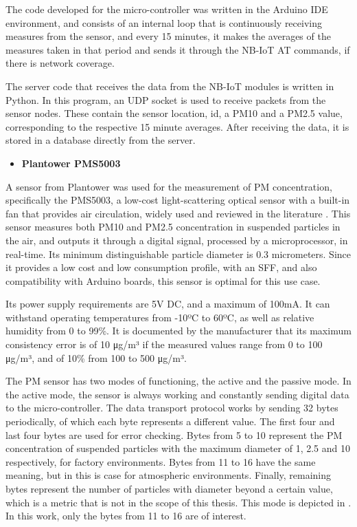 The code developed for the micro-controller was written in the Arduino IDE environment, and consists of an internal loop that is continuously receiving measures from the sensor, and every 15 minutes, it makes the averages of the measures taken in that period and sends it through the NB-IoT AT commands, if there is network coverage.

The server code that receives the data from the NB-IoT modules is written in Python. In this program, an \ac{UDP} socket is used to receive packets from the sensor nodes. These contain the sensor location, id, a PM10 and a PM2.5 value, corresponding to the respective 15 minute averages. After receiving the data, it is stored in a database directly from the server.


\begin{itemize}[leftmargin=0.0mm]
  \item[] \textbf{Plantower PMS5003}
\end{itemize}

\noindent
A sensor from Plantower was used for the measurement of PM concentration, specifically the PMS5003, a low-cost light-scattering optical sensor with a built-in fan that provides air circulation, widely used and reviewed in the literature \cite{Kuula2019}\cite{Zheng2018}\cite{Zheng2019}\cite{Wendt2019}\cite{Ford2019}\cite{Manikonda2016}\cite{Liu2017}\cite{Sayahi2018}. This sensor measures both PM10 and PM2.5 concentration in suspended particles in the air, and outputs it through a digital signal, processed by a microprocessor, in real-time. Its minimum distinguishable particle diameter is 0.3 micrometers. Since it provides a low cost and low consumption profile, with an SFF, and also compatibility with Arduino boards, this sensor is optimal for this use case.



Its power supply requirements are 5V DC, and a maximum of 100mA. It can withstand operating temperatures from -10ºC to 60ºC, as well as relative humidity from 0 to 99\%. It is documented by the manufacturer that its maximum consistency error is of 10 μg/m³ if the measured values range from 0 to 100 μg/m³, and of 10\% from 100 to 500 μg/m³.

The PM sensor has two modes of functioning, the active and the passive mode. In the active mode, the sensor is always working and constantly sending digital data to the micro-controller. The data transport protocol works by sending 32 bytes periodically, of which each byte represents a different value. The first four and last four bytes are used for error checking. Bytes from 5 to 10 represent the PM concentration of suspended particles with the maximum diameter of 1, 2.5 and 10 respectively, for factory environments. Bytes from 11 to 16 have the same meaning, but in this is case for atmospheric environments. Finally, remaining bytes represent the number of particles with diameter beyond a certain value, which is a metric that is not in the scope of this thesis. This mode is depicted in .
In this work, only the bytes from 11 to 16 are of interest.


